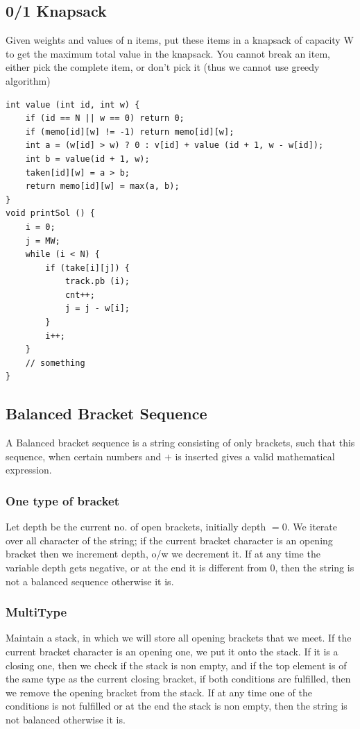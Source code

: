 \documentclass[8pt, a4paper, oneside, twocolumn]{extarticle}
\begin{document}
\subsection{0/1 Knapsack}
Given weights and values of n items, put these items in a knapsack of capacity W to get the maximum total value in the knapsack. You cannot break an item, either pick the complete item, or don’t pick it (thus we cannot use greedy algorithm)
\begin{verbatim}
int value (int id, int w) {
    if (id == N || w == 0) return 0;
    if (memo[id][w] != -1) return memo[id][w];
    int a = (w[id] > w) ? 0 : v[id] + value (id + 1, w - w[id]);
    int b = value(id + 1, w);
    taken[id][w] = a > b;
    return memo[id][w] = max(a, b);
}
void printSol () {
    i = 0;
    j = MW;
    while (i < N) {
        if (take[i][j]) {
            track.pb (i);
            cnt++;
            j = j - w[i];
        }
        i++;
    }
    // something
}
\end{verbatim}
\subsection{Balanced Bracket Sequence}
A Balanced bracket sequence is a string consisting of only brackets, such that this sequence, when certain numbers and $+$ is inserted gives a valid mathematical expression.
\subsubsection{One type of bracket}
Let depth be the current no. of open brackets, initially depth $= 0$. We iterate over all character of the string; if the current bracket character is an opening bracket then we increment depth, o/w we decrement it. If at any time the variable depth gets negative, or at the end it is different from 0, then the string is not a balanced sequence otherwise it is.
\subsubsection{MultiType}
Maintain a stack, in which we will store all opening brackets that we meet. If the current bracket character is an opening one, we put it onto the stack. If it is a closing one, then we check if the stack is non empty, and if the top element is of the same type as the current closing bracket, if both conditions are fulfilled, then we remove the opening bracket from the stack. If at any time one of the conditions is not fulfilled or at the end the stack is non empty, then the string is not balanced otherwise it is.
\end{document}
